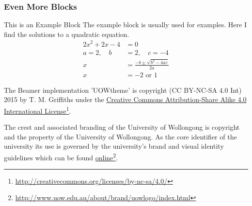 \documentclass[aspectratio=169]{beamer}
\begin{document}


\begin{frame}
\frametitle{Even More Blocks}
   \begin{exampleblock}{This is an Example Block}
      The example block is usually used for examples. Here I find the solutions to a quadratic equation.
      \begin{align*}
         2x^2 + 2x - 4 & = 0 \\
         a=2, \quad b & =2, \quad c=-4\\
         x & =\frac{-b\pm\sqrt{b^2-4ac}}{2a} \\
         x & =-2 \text{ or } 1
      \end{align*}
   \end{exampleblock}
\end{frame}


\begin{frame}\footnotesize
   The Beamer implementation 'UOWtheme' is copyright (CC BY-NC-SA 4.0 Int) 2015 by T. M. Griffiths under the \href{http://creativecommons.org/licenses/by-sa/4.0/}{Creative Commons Attribution-Share Alike 4.0 International License}\footnote{\url{http://creativecommons.org/licenses/by-nc-sa/4.0/}}.
   
   \begin{center}\ccbysa\end{center}
   
   The crest and associated branding of the University of Wollongong is copyright and the property of the University of Wollongong. As the core identifier of the university its use is governed by the university's brand and visual identity guidelines which can be found \href{http://www.uow.edu.au/about/brand/uowlogo/index.html}{online}\footnote{\url{http://www.uow.edu.au/about/brand/uowlogo/index.html}}.
   
\end{frame}
\end{document}
